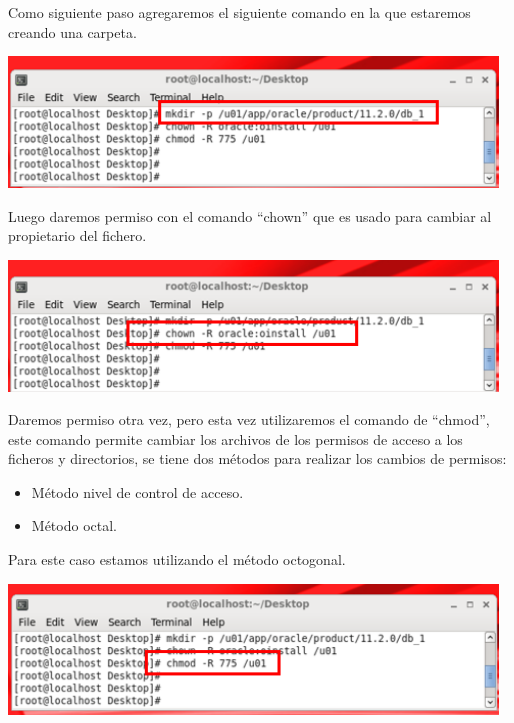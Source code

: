 \vspace{\baselineskip}

Como siguiente paso agregaremos el siguiente comando en la que estaremos creando una carpeta. 
	\begin{center}
		\includegraphics[width=13cm]{./Imagenes/40} 
	\end{center} 

\vspace{\baselineskip}

Luego daremos permiso con el comando “chown” que es usado para cambiar al propietario del fichero. 
	\begin{center}
		\includegraphics[width=13cm]{./Imagenes/41} 
	\end{center} 

\vspace{\baselineskip}

Daremos permiso otra vez, pero esta vez utilizaremos el comando de “chmod”, este comando permite cambiar los archivos de los permisos de acceso a los ficheros y directorios, se tiene dos métodos para realizar los cambios de permisos: 
\begin{itemize}
	\item Método nivel de control de acceso.
	\item Método octal.
\end{itemize}
Para este caso estamos utilizando el método octogonal. 
	\begin{center}
		\includegraphics[width=13cm]{./Imagenes/42} 
	\end{center} 

